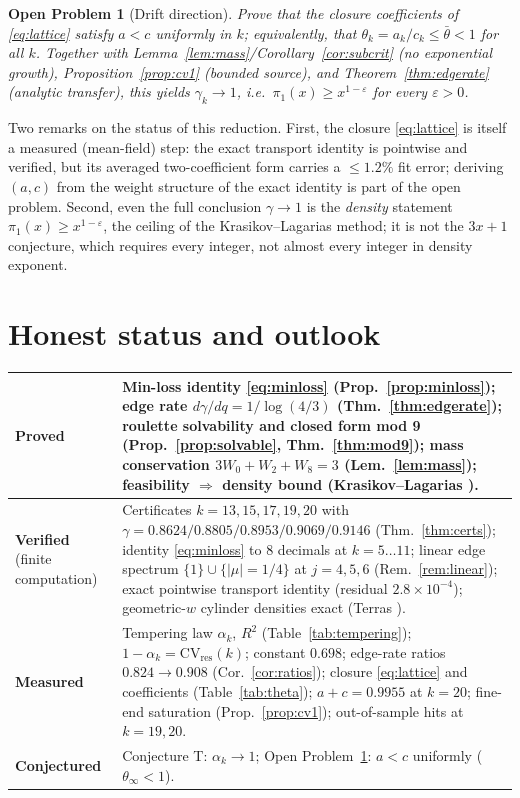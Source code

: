 \documentclass[11pt]{article}
\newtheorem{openproblem}[theorem]{Open Problem}
\theoremstyle{definition}
\theoremstyle{remark}
\newcommand{\CV}{\mathrm{CV}}
\newcommand{\gam}{\gamma}
\begin{document}
\begin{openproblem}[Drift direction]\label{open:drift}
Prove that the closure coefficients of \eqref{eq:lattice} satisfy $a < c$
uniformly in $k$; equivalently, that $\theta_k = a_k / c_k \leq \bar\theta < 1$
for all $k$. Together with Lemma~\ref{lem:mass}/Corollary~\ref{cor:subcrit}
(no exponential growth), Proposition~\ref{prop:cv1} (bounded source), and
Theorem~\ref{thm:edgerate} (analytic transfer), this yields
$\gam_k \to 1$, i.e.\ $\pi_1(x) \geq x^{1-\varepsilon}$ for every
$\varepsilon > 0$.
\end{openproblem}

Two remarks on the status of this reduction. First, the closure
\eqref{eq:lattice} is itself a measured (mean-field) step: the exact transport
identity is pointwise and verified, but its averaged two-coefficient form
carries a $\leq 1.2\%$ fit error; deriving $(a, c)$ from the weight structure
of the exact identity is part of the open problem. Second, even the full
conclusion $\gam \to 1$ is the \emph{density} statement
$\pi_1(x) \geq x^{1-\varepsilon}$, the ceiling of the Krasikov--Lagarias
method; it is not the $3x+1$ conjecture, which requires every integer, not
almost every integer in density exponent.

\section{Honest status and outlook}
\label{sec:status}

\begin{center}
\begin{tabular}{p{} p{}}
\hline
\textbf{Proved} &
Min-loss identity \eqref{eq:minloss} (Prop.~\ref{prop:minloss});
edge rate $d\gam/dq = 1/\log(4/3)$ (Thm.~\ref{thm:edgerate});
roulette solvability and closed form mod 9
(Prop.~\ref{prop:solvable}, Thm.~\ref{thm:mod9});
mass conservation $3W_0 + W_2 + W_8 = 3$ (Lem.~\ref{lem:mass});
feasibility $\Rightarrow$ density bound (Krasikov--Lagarias \cite{KL03}). \\
\hline
\textbf{Verified} (finite computation) &
Certificates $k = 13, 15, 17, 19, 20$ with
$\gam = 0.8624 / 0.8805 / 0.8953 / 0.9069 / 0.9146$ (Thm.~\ref{thm:certs});
identity \eqref{eq:minloss} to $8$ decimals at $k = 5\ldots11$;
linear edge spectrum $\{1\} \cup \{|\mu| = 1/4\}$ at $j = 4, 5, 6$
(Rem.~\ref{rem:linear}); exact pointwise transport identity
(residual $2.8 \times 10^{-4}$); geometric-$w$ cylinder densities exact
(Terras \cite{Ter76}). \\
\hline
\textbf{Measured} &
Tempering law $\alpha_k$, $R^2$ (Table~\ref{tab:tempering});
$1 - \alpha_k = \CV_{\mathrm{res}}(k)$; constant $0.698$;
edge-rate ratios $0.824 \to 0.908$ (Cor.~\ref{cor:ratios});
closure \eqref{eq:lattice} and coefficients (Table~\ref{tab:theta});
$a + c = 0.9955$ at $k = 20$; fine-end saturation (Prop.~\ref{prop:cv1});
out-of-sample hits at $k = 19, 20$. \\
\hline
\textbf{Conjectured} &
Conjecture T: $\alpha_k \to 1$;
Open Problem~\ref{open:drift}: $a < c$ uniformly ($\theta_\infty < 1$). \\
\hline
\end{tabular}
\end{center}
\end{document}
